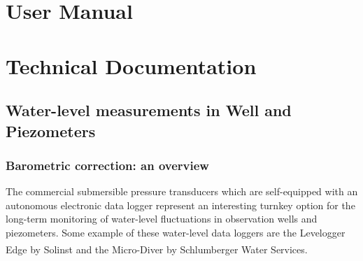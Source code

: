 \documentclass[12pt, letterpaper, fleqn]{report}
\begin{document}


\listoffigures

\tableofcontents

\part{User Manual}


\part{Technical Documentation}

\chapter{Water-level measurements in Well and Piezometers}

\section{Barometric correction: an overview}

The commercial submersible pressure transducers which are self-equipped with an autonomous electronic data logger represent an interesting turnkey option for the long-term monitoring of water-level fluctuations in observation wells and piezometers. Some example of these water-level data loggers are the Levelogger Edge\textsuperscript{\textregistered} by Solinst and the Micro-Diver\textsuperscript{\textregistered} by Schlumberger Water Services. 
\end{document}
